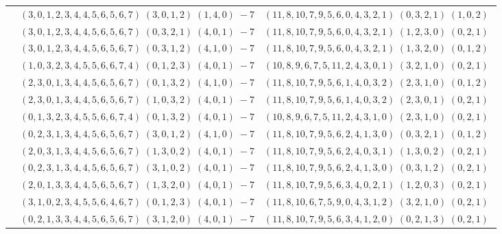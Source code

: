\documentclass[11pt]{article}
\begin{document}
\begin{longtable}[l]{|c|c|c|}
 \cline{2-3} 
 & $(3 ,0 ,1 ,2 ,3 ,4 ,4 ,5 ,6 ,5 ,6 ,7) \;(3 ,0 ,1 ,2) \;(1 ,4 ,0) \;-7$ & $(11 ,8 ,10 ,7 ,9 ,5 ,6 ,0 ,4 ,3 ,2 ,1) \;(0 ,3 ,2 ,1) \;(1 ,0 ,2) \;$\\ 
 \cline{2-3} 
 & $(3 ,0 ,1 ,2 ,3 ,4 ,4 ,5 ,6 ,5 ,6 ,7) \;(0 ,3 ,2 ,1) \;(4 ,0 ,1) \;-7$ & $(11 ,8 ,10 ,7 ,9 ,5 ,6 ,0 ,4 ,3 ,2 ,1) \;(1 ,2 ,3 ,0) \;(0 ,2 ,1) \;$\\ 
 \cline{2-3} 
 & $(3 ,0 ,1 ,2 ,3 ,4 ,4 ,5 ,6 ,5 ,6 ,7) \;(0 ,3 ,1 ,2) \;(4 ,1 ,0) \;-7$ & $(11 ,8 ,10 ,7 ,9 ,5 ,6 ,0 ,4 ,3 ,2 ,1) \;(1 ,3 ,2 ,0) \;(0 ,1 ,2) \;$\\ 
 \cline{2-3} 
 & $(1 ,0 ,3 ,2 ,3 ,4 ,5 ,5 ,6 ,6 ,7 ,4) \;(0 ,1 ,2 ,3) \;(4 ,0 ,1) \;-7$ & $(10 ,8 ,9 ,6 ,7 ,5 ,11 ,2 ,4 ,3 ,0 ,1) \;(3 ,2 ,1 ,0) \;(0 ,2 ,1) \;$\\ 
 \cline{2-3} 
 & $(2 ,3 ,0 ,1 ,3 ,4 ,4 ,5 ,6 ,5 ,6 ,7) \;(0 ,1 ,3 ,2) \;(4 ,1 ,0) \;-7$ & $(11 ,8 ,10 ,7 ,9 ,5 ,6 ,1 ,4 ,0 ,3 ,2) \;(2 ,3 ,1 ,0) \;(0 ,1 ,2) \;$\\ 
 \cline{2-3} 
 & $(2 ,3 ,0 ,1 ,3 ,4 ,4 ,5 ,6 ,5 ,6 ,7) \;(1 ,0 ,3 ,2) \;(4 ,0 ,1) \;-7$ & $(11 ,8 ,10 ,7 ,9 ,5 ,6 ,1 ,4 ,0 ,3 ,2) \;(2 ,3 ,0 ,1) \;(0 ,2 ,1) \;$\\ 
 \cline{2-3} 
 & $(0 ,1 ,3 ,2 ,3 ,4 ,5 ,5 ,6 ,6 ,7 ,4) \;(0 ,1 ,3 ,2) \;(4 ,0 ,1) \;-7$ & $(10 ,8 ,9 ,6 ,7 ,5 ,11 ,2 ,4 ,3 ,1 ,0) \;(2 ,3 ,1 ,0) \;(0 ,2 ,1) \;$\\ 
 \cline{2-3} 
 & $(0 ,2 ,3 ,1 ,3 ,4 ,4 ,5 ,6 ,5 ,6 ,7) \;(3 ,0 ,1 ,2) \;(4 ,1 ,0) \;-7$ & $(11 ,8 ,10 ,7 ,9 ,5 ,6 ,2 ,4 ,1 ,3 ,0) \;(0 ,3 ,2 ,1) \;(0 ,1 ,2) \;$\\ 
 \cline{2-3} 
 & $(2 ,0 ,3 ,1 ,3 ,4 ,4 ,5 ,6 ,5 ,6 ,7) \;(1 ,3 ,0 ,2) \;(4 ,0 ,1) \;-7$ & $(11 ,8 ,10 ,7 ,9 ,5 ,6 ,2 ,4 ,0 ,3 ,1) \;(1 ,3 ,0 ,2) \;(0 ,2 ,1) \;$\\ 
 \cline{2-3} 
 & $(0 ,2 ,3 ,1 ,3 ,4 ,4 ,5 ,6 ,5 ,6 ,7) \;(3 ,1 ,0 ,2) \;(4 ,0 ,1) \;-7$ & $(11 ,8 ,10 ,7 ,9 ,5 ,6 ,2 ,4 ,1 ,3 ,0) \;(0 ,3 ,1 ,2) \;(0 ,2 ,1) \;$\\ 
 \cline{2-3} 
 & $(2 ,0 ,1 ,3 ,3 ,4 ,4 ,5 ,6 ,5 ,6 ,7) \;(1 ,3 ,2 ,0) \;(4 ,0 ,1) \;-7$ & $(11 ,8 ,10 ,7 ,9 ,5 ,6 ,3 ,4 ,0 ,2 ,1) \;(1 ,2 ,0 ,3) \;(0 ,2 ,1) \;$\\ 
 \cline{2-3} 
 & $(3 ,1 ,0 ,2 ,3 ,4 ,5 ,5 ,6 ,4 ,6 ,7) \;(0 ,1 ,2 ,3) \;(4 ,0 ,1) \;-7$ & $(11 ,8 ,10 ,6 ,7 ,5 ,9 ,0 ,4 ,3 ,1 ,2) \;(3 ,2 ,1 ,0) \;(0 ,2 ,1) \;$\\ 
 \cline{2-3} 
 & $(0 ,2 ,1 ,3 ,3 ,4 ,4 ,5 ,6 ,5 ,6 ,7) \;(3 ,1 ,2 ,0) \;(4 ,0 ,1) \;-7$ & $(11 ,8 ,10 ,7 ,9 ,5 ,6 ,3 ,4 ,1 ,2 ,0) \;(0 ,2 ,1 ,3) \;(0 ,2 ,1) \;$\\ 

\end{longtable}
\end{document}
